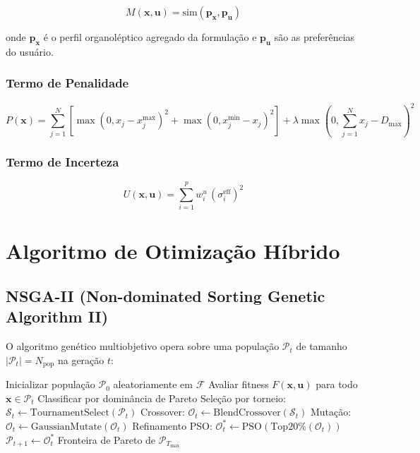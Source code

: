 \documentclass[12pt, a4paper]{article}
\begin{document}
\begin{equation}
M(\mathbf{x}, \mathbf{u}) = \text{sim}(\mathbf{p}_{\mathbf{x}}, \mathbf{p}_{\mathbf{u}})
\end{equation}

onde $\mathbf{p}_{\mathbf{x}}$ é o perfil organoléptico agregado da formulação e $\mathbf{p}_{\mathbf{u}}$ são as preferências do usuário.

\subsubsection{Termo de Penalidade}

\begin{equation}
P(\mathbf{x}) = \sum_{j=1}^N \left[\max(0, x_j - x_j^{\max})^2 + \max(0, x_j^{\min} - x_j)^2\right] + \lambda \max(0, \sum_{j=1}^N x_j - D_{\max})^2
\end{equation}

\subsubsection{Termo de Incerteza}

\begin{equation}
U(\mathbf{x}, \mathbf{u}) = \sum_{i=1}^p w_i^u \, (\sigma_i^{\text{eff}})^2
\end{equation}

\section{Algoritmo de Otimização Híbrido}

\subsection{NSGA-II (Non-dominated Sorting Genetic Algorithm II)}

O algoritmo genético multiobjetivo opera sobre uma população $\mathcal{P}_t$ de tamanho $|\mathcal{P}_t| = N_{\text{pop}}$ na geração $t$:

\begin{algorithm}
\caption{NSGA-II para SynPhytica}
\begin{algorithmic}[1]
\State Inicializar população $\mathcal{P}_0$ aleatoriamente em $\mathcal{F}$
    \State Avaliar fitness $F(\mathbf{x}, \mathbf{u})$ para todo $\mathbf{x} \in \mathcal{P}_t$
    \State Classificar por dominância de Pareto
    \State Seleção por torneio: $\mathcal{S}_t \leftarrow \text{TournamentSelect}(\mathcal{P}_t)$
    \State Crossover: $\mathcal{O}_t \leftarrow \text{BlendCrossover}(\mathcal{S}_t)$
    \State Mutação: $\mathcal{O}_t \leftarrow \text{GaussianMutate}(\mathcal{O}_t)$
    \State Refinamento PSO: $\mathcal{O}_t^* \leftarrow \text{PSO}(\text{Top20\%}(\mathcal{O}_t))$
    \State $\mathcal{P}_{t+1} \leftarrow \mathcal{O}_t^*$
\EndFor
\State \Return Fronteira de Pareto de $\mathcal{P}_{T_{\max}}$
\end{algorithmic}
\end{algorithm}
\end{document}
